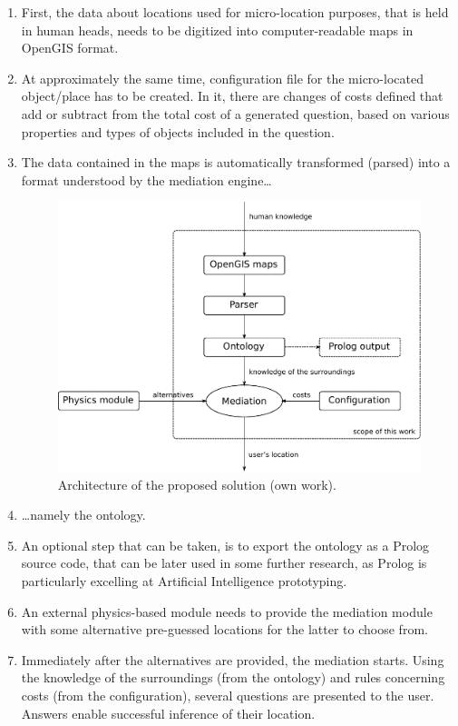 \begin{enumerate}
	\item First, the data about locations used for micro-location purposes, that is held in human heads, needs to be digitized into computer-readable maps in OpenGIS format.
	\item At approximately the same time, configuration file for the micro-located object/place has to be created. In it, there are changes of costs defined that add or subtract from the total cost of a generated question, based on various properties and types of objects included in the question.
	\item The data contained in the maps is automatically transformed (parsed) into a format understood by the mediation engine\ldots

	\begin{figure}
		\centering
		\includegraphics[width=\textwidth]{architecture}
		\caption{Architecture of the proposed solution (own work).}
		\label{fig:architecture}
	\end{figure}

	\item \ldots{}namely the ontology.
	\item An optional step that can be taken, is to export the ontology as a Prolog source code, that can be later used in some further research, as Prolog is particularly excelling at Artificial Intelligence prototyping.
	\item An external physics-based module needs to provide the mediation module with some alternative pre-guessed locations for the latter to choose from.
	\item Immediately after the alternatives are provided, the mediation starts. Using the knowledge of the surroundings (from the ontology) and rules concerning costs (from the configuration), several questions are presented to the user. Answers enable successful inference of their location.
\end{enumerate}

